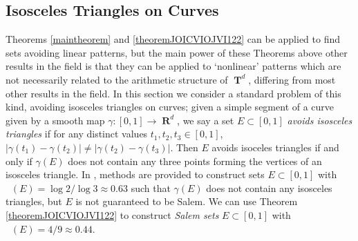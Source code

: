 \documentclass[dvipsnames,letterpaper,12pt]{article}
\numberwithin{equation}{section}
\DeclareMathOperator{\hausdim}{\dim_{\mathbf{H}}}
\DeclareMathOperator{\fordim}{\dim_{\mathbf{F}}}
\DeclareMathOperator{\RR}{\mathbf{R}}
\DeclareMathOperator{\TT}{\mathbf{T}}
\numberwithin{theorem}{section}
\begin{document}
\subsection{Isosceles Triangles on Curves}

Theorems \ref{maintheorem} and \ref{theoremJOICVIOJVI122} can be applied to find sets avoiding linear patterns, but the main power of these Theorems above other results in the field is that they can be applied to `nonlinear' patterns which are not necessarily related to the arithmetic structure of $\TT^d$, differing from most other results in the field. In this section we consider a standard problem of this kind, avoiding isosceles triangles on curves; given a simple segment of a curve given by a smooth map $\gamma : [0,1] \to \RR^d$, we say a set $E \subset [0,1]$ \emph{avoids isosceles triangles} if for any distinct values $t_1,t_2,t_3 \in [0,1]$, $|\gamma(t_1) - \gamma(t_2)| \neq |\gamma(t_2) - \gamma(t_3)|$. Then $E$ avoids isoceles triangles if and only if $\gamma(E)$ does not contain any three points forming the vertices of an  isosceles triangle. In \cite{PramanikFraser}, methods are provided to construct sets $E \subset [0,1]$ with $\hausdim(E) = \log 2 / \log 3 \approx 0.63$ such that $\gamma(E)$ does not contain any isosceles triangles, but $E$ is not guaranteed to be Salem. We can use Theorem \ref{theoremJOICVIOJVI122} to construct \emph{Salem sets} $E \subset [0,1]$ with $\fordim(E) = 4/9 \approx 0.44$.
\end{document}
